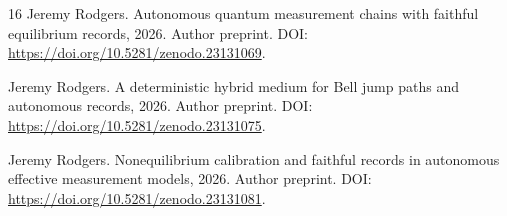 \documentclass[11pt]{article}
\theoremstyle{definition}\newtheorem{definition}[theorem]{Definition}
\theoremstyle{remark}\newtheorem{remark}[theorem]{Remark}
\begin{document}
\begin{thebibliography}{16}
Jeremy Rodgers.
\newblock Autonomous quantum measurement chains with faithful equilibrium
  records, 2026{}.
\newblock Author preprint. DOI: \url{https://doi.org/10.5281/zenodo.23131069}.

Jeremy Rodgers.
\newblock A deterministic hybrid medium for {Bell} jump paths and autonomous
  records, 2026{}.
\newblock Author preprint. DOI: \url{https://doi.org/10.5281/zenodo.23131075}.

Jeremy Rodgers.
\newblock Nonequilibrium calibration and faithful records in autonomous
  effective measurement models, 2026{}.
\newblock Author preprint. DOI: \url{https://doi.org/10.5281/zenodo.23131081}.

\end{thebibliography}
\end{document}
